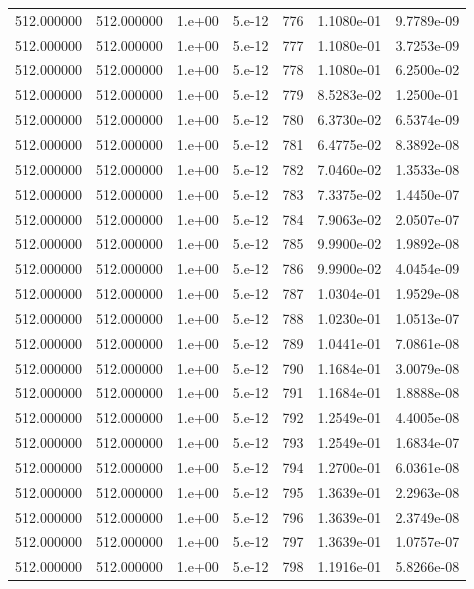 \begin{table}[htbp]
\begin{tabular}{rrrrrrr}
512.000000 & 512.000000 & 1.e+00 & 5.e-12 & 776 & 1.1080e-01 & 9.7789e-09 \\
512.000000 & 512.000000 & 1.e+00 & 5.e-12 & 777 & 1.1080e-01 & 3.7253e-09 \\
512.000000 & 512.000000 & 1.e+00 & 5.e-12 & 778 & 1.1080e-01 & 6.2500e-02 \\
512.000000 & 512.000000 & 1.e+00 & 5.e-12 & 779 & 8.5283e-02 & 1.2500e-01 \\
512.000000 & 512.000000 & 1.e+00 & 5.e-12 & 780 & 6.3730e-02 & 6.5374e-09 \\
512.000000 & 512.000000 & 1.e+00 & 5.e-12 & 781 & 6.4775e-02 & 8.3892e-08 \\
512.000000 & 512.000000 & 1.e+00 & 5.e-12 & 782 & 7.0460e-02 & 1.3533e-08 \\
512.000000 & 512.000000 & 1.e+00 & 5.e-12 & 783 & 7.3375e-02 & 1.4450e-07 \\
512.000000 & 512.000000 & 1.e+00 & 5.e-12 & 784 & 7.9063e-02 & 2.0507e-07 \\
512.000000 & 512.000000 & 1.e+00 & 5.e-12 & 785 & 9.9900e-02 & 1.9892e-08 \\
512.000000 & 512.000000 & 1.e+00 & 5.e-12 & 786 & 9.9900e-02 & 4.0454e-09 \\
512.000000 & 512.000000 & 1.e+00 & 5.e-12 & 787 & 1.0304e-01 & 1.9529e-08 \\
512.000000 & 512.000000 & 1.e+00 & 5.e-12 & 788 & 1.0230e-01 & 1.0513e-07 \\
512.000000 & 512.000000 & 1.e+00 & 5.e-12 & 789 & 1.0441e-01 & 7.0861e-08 \\
512.000000 & 512.000000 & 1.e+00 & 5.e-12 & 790 & 1.1684e-01 & 3.0079e-08 \\
512.000000 & 512.000000 & 1.e+00 & 5.e-12 & 791 & 1.1684e-01 & 1.8888e-08 \\
512.000000 & 512.000000 & 1.e+00 & 5.e-12 & 792 & 1.2549e-01 & 4.4005e-08 \\
512.000000 & 512.000000 & 1.e+00 & 5.e-12 & 793 & 1.2549e-01 & 1.6834e-07 \\
512.000000 & 512.000000 & 1.e+00 & 5.e-12 & 794 & 1.2700e-01 & 6.0361e-08 \\
512.000000 & 512.000000 & 1.e+00 & 5.e-12 & 795 & 1.3639e-01 & 2.2963e-08 \\
512.000000 & 512.000000 & 1.e+00 & 5.e-12 & 796 & 1.3639e-01 & 2.3749e-08 \\
512.000000 & 512.000000 & 1.e+00 & 5.e-12 & 797 & 1.3639e-01 & 1.0757e-07 \\
512.000000 & 512.000000 & 1.e+00 & 5.e-12 & 798 & 1.1916e-01 & 5.8266e-08 \\

\end{tabular}
\end{table}

